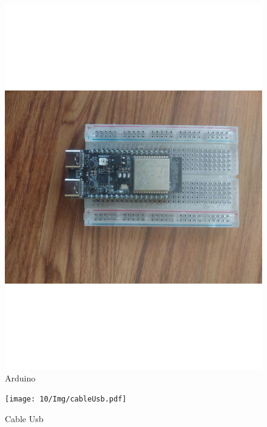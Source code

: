 \begin{figure}[H]
        \centering
        \includegraphics[trim = {40mm 120mm 50mm 100mm},clip,scale=0.2]{10/Img/arduino.pdf}
        \caption{Arduino}
        \label{Arduino}
    \end{figure}

\begin{figure}[H]
        \centering
        \texttt{[image: 10/Img/cableUsb.pdf]}
        \caption{Cable Usb}
        \label{Cable usb}
    \end{figure}
    
